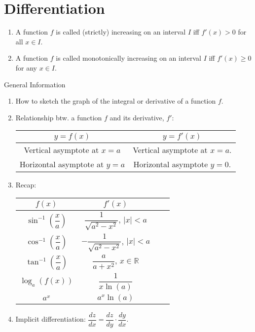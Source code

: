 \chapter{Differentiation}
\begin{definition*}{}{}
  \begin{enumerate}
    \item A function \(f\) is called (strictly) increasing on an interval \(I\) iff \(f'(x)>0\) for all \(x \in I\).
    \item A function \(f\) is called monotonically increasing on an interval \(I\) iff \(f'(x) \geq 0\) for any \(x \in I\).
  \end{enumerate}
\end{definition*}
\begin{stbox}{General Information}
  \begin{enumerate}
    \item How to sketch the graph of the integral or derivative of a function \(f\).
    \item Relationship btw. a function \(f\) and its derivative, \(f'\):\\
    \begin{center}
      \begin{tabular}{|c|c|}
        \hline
        \(y=f(x)\) & \(y=f'(x)\)\\
        \hline
        Vertical asymptote at \(x=a\) & Vertical asymptote at \(x=a\).\\
        \hline
        Horizontal asymptote at \(y=a\) & Horizontal asymptote \(y=0\).\\
        \hline
      \end{tabular}
    \end{center}
    \item Recap:\\
    \begin{center}
      \begin{tabular}{|Sc|Sc|}
        \hline
        \(f(x)\) & \(f'(x)\)\\
        \hline
        \(\sin^{-1}\left(\dfrac{x}{a}\right)\) & \(\dfrac{1}{\sqrt{a^2-x^2}}\), \(\lvert x \rvert<a\)\\
        \hline
        \(\cos^{-1}\left(\dfrac{x}{a}\right)\) & \(-\dfrac{1}{\sqrt{a^2-x^2}}\), \(\lvert x \rvert<a\)\\
        \hline
        \(\tan^{-1}\left(\dfrac{x}{a}\right)\) & \(\dfrac{a}{a+x^2}\), \(x \in \mathbb{R}\)\\
        \hline
        \(\log_a(f(x))\) &  \(\dfrac{1}{x \ln(a)}\)\\
        \hline
        \(a^x\) & \(a^x \ln(a)\)\\
        \hline
      \end{tabular}
    \end{center}
    \item Implicit differentiation: \(\dfrac{dz}{dx}=\dfrac{dz}{dy}\cdot \dfrac{dy}{dx}\).
  \end{enumerate}
\end{stbox}
